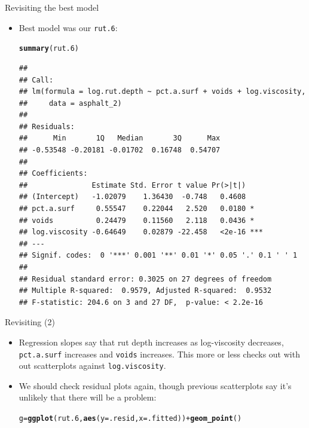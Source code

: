 \documentclass[unknownkeysallowed]{beamer}\usepackage[]{graphicx}\usepackage[]{color}
\makeatletter
\newcommand{\hlopt}[1]{\textcolor[rgb]{0,0,0}{#1}}%
\newcommand{\hlstd}[1]{\textcolor[rgb]{0.345,0.345,0.345}{#1}}%
\newcommand{\hlkwb}[1]{\textcolor[rgb]{0.69,0.353,0.396}{#1}}%
\newcommand{\hlkwc}[1]{\textcolor[rgb]{0.333,0.667,0.333}{#1}}%
\newcommand{\hlkwd}[1]{\textcolor[rgb]{0.737,0.353,0.396}{\textbf{#1}}}%
\newenvironment{kframe}{%
 \def\at@end@of@kframe{}%
 \ifinner\ifhmode%
  \def\at@end@of@kframe{\end{minipage}}%
  \begin{minipage}{\columnwidth}%
 \fi\fi%
 \def\FrameCommand##1{\hskip\@totalleftmargin \hskip-\fboxsep
 \colorbox{shadecolor}{##1}\hskip-\fboxsep
     \hskip-\linewidth \hskip-\@totalleftmargin \hskip\columnwidth}%
 \MakeFramed {\advance\hsize-\width
   \@totalleftmargin\z@ \linewidth\hsize
   \@setminipage}}%
 {\par\unskip\endMakeFramed%
 \at@end@of@kframe}
\newenvironment{knitrout}{}{} %
\makeatother
\begin{document}
\begin{frame}[fragile]{Revisiting the best model}
  
  \begin{itemize}
  \item Best model was our \texttt{rut.6}:
    \begin{scriptsize}
\begin{knitrout}
\color{fgcolor}\begin{kframe}
\begin{alltt}
\hlkwd{summary}\hlstd{(rut.6)}
\end{alltt}
\begin{verbatim}
## 
## Call:
## lm(formula = log.rut.depth ~ pct.a.surf + voids + log.viscosity, 
##     data = asphalt_2)
## 
## Residuals:
##      Min       1Q   Median       3Q      Max 
## -0.53548 -0.20181 -0.01702  0.16748  0.54707 
## 
## Coefficients:
##               Estimate Std. Error t value Pr(>|t|)    
## (Intercept)   -1.02079    1.36430  -0.748   0.4608    
## pct.a.surf     0.55547    0.22044   2.520   0.0180 *  
## voids          0.24479    0.11560   2.118   0.0436 *  
## log.viscosity -0.64649    0.02879 -22.458   <2e-16 ***
## ---
## Signif. codes:  0 '***' 0.001 '**' 0.01 '*' 0.05 '.' 0.1 ' ' 1
## 
## Residual standard error: 0.3025 on 27 degrees of freedom
## Multiple R-squared:  0.9579,	Adjusted R-squared:  0.9532 
## F-statistic: 204.6 on 3 and 27 DF,  p-value: < 2.2e-16
\end{verbatim}
\end{kframe}
\end{knitrout}
      
    \end{scriptsize}
  \end{itemize}
  
\end{frame}

\begin{frame}[fragile]{Revisiting (2)}
  
  \begin{itemize}
  \item Regression slopes say that rut depth increases as
    log-viscosity decreases, \texttt{pct.a.surf} increases and
    \texttt{voids} increases. This more or less checks out with out
    scatterplots against \texttt{log.viscosity}.
  \item We should check residual plots again, though previous
    scatterplots say it's unlikely that there will be a problem:
    
\begin{knitrout}
\color{fgcolor}\begin{kframe}
\begin{alltt}
\hlstd{g}\hlkwb{=}\hlkwd{ggplot}\hlstd{(rut.6,}\hlkwd{aes}\hlstd{(}\hlkwc{y}\hlstd{=.resid,}\hlkwc{x}\hlstd{=.fitted))}\hlopt{+}\hlkwd{geom_point}\hlstd{()}
\end{alltt}
\end{kframe}
\end{knitrout}
  \end{itemize}
  
\end{frame}
\end{document}
